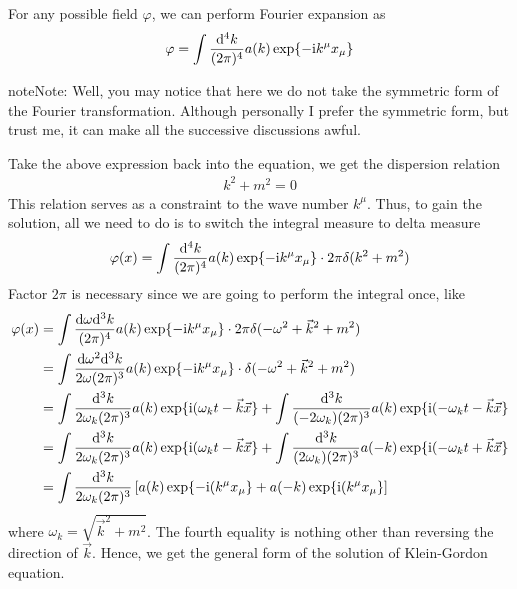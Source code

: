\documentclass[letterpaper,10pt,english]{sphinxmanual}
\begin{document}
For any possible field \(\varphi\), we can perform Fourier expansion as
\begin{equation*}
\begin{split}\varphi = \int{\mathrm d^4k\over(2\pi)^4}a(k)\exp\{-\mathrm i k^\mu x_\mu\}\end{split}
\end{equation*}
\begin{sphinxadmonition}{note}{Note:}
Well, you may notice that here we do not take the symmetric form of the Fourier transformation. Although personally I prefer the symmetric form, but trust me, it can make all the successive discussions awful.
\end{sphinxadmonition}

Take the above expression back into the equation, we get the dispersion relation
\begin{equation*}
\begin{split}k^2 + m^2 = 0\end{split}
\end{equation*}
This relation serves as a constraint to the wave number \(k^\mu\). Thus, to gain the solution, all we need to do is to switch the integral measure to delta measure
\begin{equation*}
\begin{split}\varphi(x) = \int{\mathrm d^4k\over(2\pi)^4}a(k)\exp\{-\mathrm i k^\mu x_\mu\}\cdot2\pi\delta(k^2+m^2)\end{split}
\end{equation*}
Factor \(2\pi\) is necessary since we are going to perform the integral once, like
\begin{equation*}
\begin{split}\varphi(x) &= \int{\mathrm d\omega \mathrm d^3k\over(2\pi)^4}a(k)\exp\{-\mathrm i k^\mu x_\mu\}\cdot2\pi\delta(-\omega^2 + \vec k^2 + m^2)\\
&= \int{\mathrm d\omega^2 \mathrm d^3k\over2\omega(2\pi)^3}a(k)\exp\{-\mathrm i k^\mu x_\mu\}\cdot\delta(-\omega^2 + \vec k^2 + m^2)\\
&= \int{\mathrm d^3k\over2\omega_k(2\pi)^3}a(k)\exp\{\mathrm i(\omega_k t - \vec k \vec x\} + \int{\mathrm d^3k\over(-2\omega_k)(2\pi)^3}a(k)\exp\{\mathrm i(-\omega_k t - \vec k \vec x\}\\
&= \int{\mathrm d^3k\over2\omega_k(2\pi)^3}a(k)\exp\{\mathrm i(\omega_k t - \vec k \vec x\} + \int{\mathrm d^3k\over(2\omega_k)(2\pi)^3}a(-k)\exp\{\mathrm i(-\omega_k t + \vec k \vec x\}\\
&= \int{\mathrm d^3k\over2\omega_k(2\pi)^3}\left[a(k)\exp\{-\mathrm i(k^\mu x_\mu\} + a(-k)\exp\{\mathrm i(k^\mu x_\mu\} \right]\end{split}
\end{equation*}
where \(\omega_k = \sqrt{\vec k^2 + m^2}\). The fourth equality is nothing other than reversing the direction of \(\vec k\). Hence, we get the general form of the solution of Klein-Gordon equation.
\end{document}
